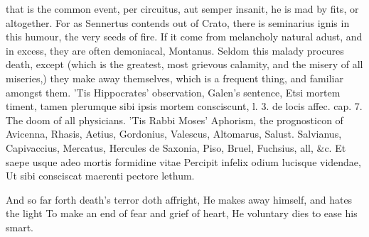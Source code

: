 that is the common event, per circuitus, aut semper insanit, he
is mad by fits, or altogether. For as Sennertus contends out of
Crato, there is seminarius ignis in this humour, the very seeds of
fire. If it come from melancholy natural adust, and in excess, they are
often demoniacal, Montanus.
Seldom this malady procures death, except (which is the greatest,
most grievous calamity, and the misery of all miseries,) they make away
themselves, which is a frequent thing, and familiar amongst them. 'Tis
Hippocrates' observation, Galen's sentence, Etsi mortem timent,
tamen plerumque sibi ipsis mortem consciscunt, l. 3. de locis affec.
cap. 7. The doom of all physicians. 'Tis Rabbi Moses' Aphorism,
the prognosticon of Avicenna, Rhasis, Aetius, Gordonius, Valescus,
Altomarus, Salust. Salvianus, Capivaccius, Mercatus, Hercules de
Saxonia, Piso, Bruel, Fuchsius, all, \&c.
Et saepe usque adeo mortis formidine vitae
Percipit infelix odium lucisque videndae,
Ut sibi consciscat maerenti pectore lethum.

And so far forth death's terror doth affright,
He makes away himself, and hates the light
To make an end of fear and grief of heart,
He voluntary dies to ease his smart.

